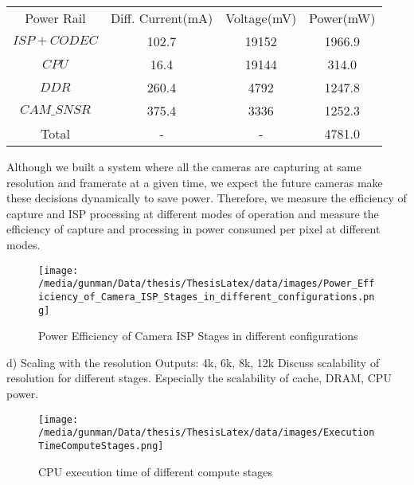 		\begin{tabular}{c|c|c|c}
			Power Rail  & Diff. Current(mA) & Voltage(mV) & Power(mW)   \\
			$ISP+CODEC$ & 102.7             & 19152       & 1966.9      \\
			$CPU$ & 16.4              & 19144       & 314.0       \\
			$DDR$ & 260.4             & 4792        & 1247.8      \\
			$CAM\_SNSR$ & 375.4             & 3336        & 1252.3      \\
			Total       & -                 & -           & 4781.0      \\
		\end{tabular} \newline
		
		Although we built a system where all the cameras are capturing at same resolution and framerate at a given time, we expect the future cameras make these decisions dynamically to save power. Therefore, we  measure the efficiency of capture and ISP processing at different modes of operation and measure the efficiency of capture and processing in power consumed per pixel at different modes.
		
\begin{figure*}
	\begin{center}
		\texttt{[image: /media/gunman/Data/thesis/ThesisLatex/data/images/Power\_Efficiency\_of\_Camera\_ISP\_Stages\_in\_different\_configurations.png]}
		\caption{Power Efficiency of Camera ISP Stages in different configurations}
		\label{fig:ex_4_9}
	\end{center}
	\vspace{-0.3in}
\end{figure*} 


d) Scaling with the resolution\newline
Outputs:
4k, 6k, 8k, 12k
Discuss scalability of resolution for different stages. \newline
Especially the scalability of cache, DRAM, CPU power. 
\begin{figure*}
	\begin{center}
		\texttt{[image: /media/gunman/Data/thesis/ThesisLatex/data/images/ExecutionTimeComputeStages.png]}
		\caption{CPU execution time of different compute stages}
		\label{fig:ex_4_9}
	\end{center}
	\vspace{-0.3in}
\end{figure*} 

